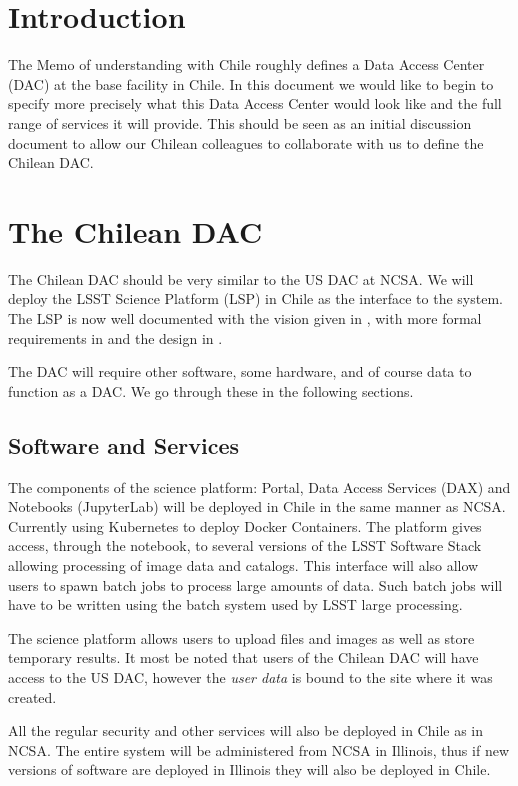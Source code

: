 \section{Introduction}


The Memo of understanding with Chile  roughly defines a Data Access Center (DAC) at the base facility in Chile.
In this document we would like to begin to specify more precisely what this Data Access Center would look like and the full range of services it will provide.
This should be seen as an initial discussion document to allow our Chilean colleagues to collaborate with us to define the Chilean DAC.

\section{The Chilean DAC}

The Chilean DAC should be very similar to the US DAC at NCSA.
We will deploy the LSST Science Platform (LSP) in Chile as the interface to the system.
The LSP is now well documented with the vision given in , with more formal requirements in  and the design in .

The DAC will require other software, some  hardware, and of course data to function as a DAC.
We go through these in the following sections.


\subsection{Software and Services}

The components of the science platform: Portal, Data Access Services (DAX) and Notebooks (JupyterLab) will be deployed in Chile in the same manner as NCSA.
Currently using Kubernetes to deploy Docker Containers.
The platform gives access, through the notebook, to several versions of the LSST Software Stack allowing processing of image data and catalogs.
This interface will also allow users to spawn batch jobs to process large amounts of data.
Such batch jobs will have to be written using the batch system used by LSST large processing.

The science platform allows users to upload files and images as well as store temporary results.
It most be noted that users of the Chilean DAC will have access to the US DAC, however the \emph{user data} is bound to the site where it was created.

All the regular security and other services will also be deployed in Chile as in NCSA.
The entire system will be administered from NCSA in Illinois, thus if new versions of software are deployed in Illinois they will also be deployed in Chile.

